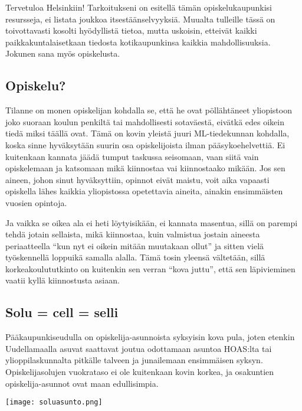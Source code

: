 \documentclass[../ala_hataile.tex]{subfiles}
\begin{document}
Tervetuloa Helsinkiin! Tarkoitukseni on
esitellä tämän opiskelukaupunkisi resursseja,
ei listata joukkoa itsestäänselvyyksiä.
Muualta tulleille tässä on toivottavasti
kosolti
hyödyllistä tietoa, mutta uskoisin, etteivät
kaikki paikkakuntalaisetkaan
tiedosta
kotikaupunkinsa kaikkia
mahdollisuuksia.
Jokunen sana myös opiskelusta.
\subsection*{Opiskelu?}
Tilanne on monen opiskelijan kohdalla
se, että he ovat pöllähtäneet yliopistoon
joko suoraan koulun penkiltä tai mahdollisesti sotaväestä, eivätkä edes oikein tiedä
miksi täällä ovat. Tämä on kovin yleistä
juuri ML-tiedekunnan kohdalla, koska
sinne hyväksytään suurin osa opiskelijoista
ilman
pääsykoehelvettiä. Ei kuitenkaan
kannata
jäädä tumput taskussa seisomaan,
vaan siitä vain opiskelemaan ja katsomaan
mikä kiinnostaa vai kiinnostaako mikään.
Jos sen aineen, johon sinut hyväksyttiin,
opinnot
eivät maistu, voit aika vapaasti
opiskella
lähes kaikkia yliopistossa opetettavia
aineita, ainakin ensimmäisten vuosien
opintoja.

Ja vaikka se oikea ala ei heti löytyisikään, ei kannata masentua, sillä on parempi tehdä
jotain sellaista, mikä kiinnostaa,
kuin valmistua
jostain aineesta periaatteella
``kun
nyt ei oikein mitään muutakaan
ollut'' ja
sitten vielä työskennellä loppuikä samalla
alalla. Tämä tosin yleensä
vältetään, sillä
korkeakoulututkinto on kuitenkin sen verran
``kova juttu'', että sen läpivieminen vaatii
kyllä kiinnostusta asiaan.
\subsection*{Solu = cell = selli}
Pääkaupunkiseudulla on opiskelija-asunnoista
syksyisin kova pula, joten etenkin
Uudellamaalla asuvat saattavat joutua
odottamaan asuntoa HOAS:lta tai ylioppilaskunnalta
pitkälle talveen ja junailemaan
ensimmäisen syksyn. Opiskelijasolujen
vuokrataso ei ole kuitenkaan kovin korkea,
ja osakuntien opiskelija-asunnot
ovat maan
edullisimpia.
\begin{figure*}[h!]
	\centering
	\texttt{[image: soluasunto.png]}
\end{figure*}
\end{document}
